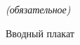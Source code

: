 \label{sec:sec_add_a}


\begin{center}
	\normalfont\normalsize{\textit{(обязательное)}}

	\normalfont\normalsize{Вводный плакат}
\end{center}

\clearpage
